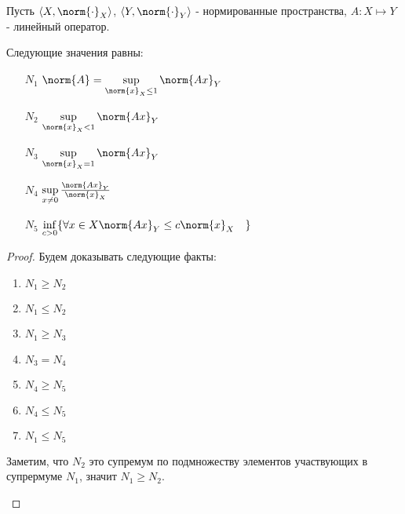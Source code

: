 
\begin{theorem} \thmslashn

    Пусть $\left<X, \norm{\cdot }_{X}\right>$, $\left<Y, \norm{\cdot }_{Y}\right>$ - нормированные пространства, $A : X \mapsto Y$ - линейный оператор.

    Следующие значения равны:

    \begin{enumerate}
        \item[$N_1$] $\norm{A} = \sup\limits_{\norm{x}_{X} \le 1} \norm{Ax}_{Y}$ 
        \item[$N_2$] $\sup\limits_{\norm{x}_{X} < 1} \norm{Ax}_{Y}$
        \item[$N_3$] $\sup\limits_{\norm{x}_{X} = 1} \norm{Ax}_{Y}$
        \item[$N_4$] $\sup\limits_{x \neq 0} \frac{\norm{Ax}_{Y}}{\norm{x}_{X}}$ 
        \item[$N_5$] $\inf\limits_{c > 0} \{\forall{x\in X} \norm{Ax}_{Y} \le c \norm{x}_{X}\quad \} $
    \end{enumerate}
    \begin{proof} \thmslashn
    
        Будем доказывать следующие факты:
        \begin{enumerate}
            \item \hyperref[opnorms:1g2]{$N_1 \ge N_2$} 
            \item \hyperref[opnorms:1l2]{$N_1 \le N_2$} 
            \item \hyperref[opnorms:1g3]{$N_1 \ge N_3$} 
            \item \hyperref[opnorms:3e4]{$N_3 = N_4$}
            \item \hyperref[opnorms:4g5]{$N_4 \ge N_5$}
            \item \hyperref[opnorms:4l5]{$N_4 \le N_5$}
            \item \hyperref[opnorms:1l5]{$N_1 \le N_5$} 
        \end{enumerate}
        \begin{lemma}[$N_1 \ge N_2$] \label{opnorms:1g2} \thmslashn
        
            Заметим, что $N_2$ это супремум по подмножеству элементов участвующих в супрермуме $N_1$, значит $N_1 \ge N_2$.
        \end{lemma}
        \begin{lemma}[$N_1 \le N_2$] \label{opnorms:1l2} \thmslashn


\end{lemma}
\end{proof}
\end{theorem}
